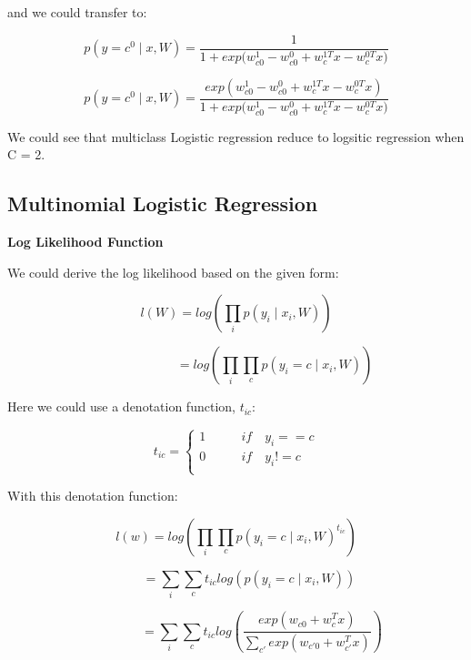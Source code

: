 \documentclass{article} %
\begin{document}
and we could transfer to:

\begin{equation}
p(y=c^0 \mid x, W) = \frac{1}
{1 + {exp(w_{c0}^1 - w_{c0}^0+ w_{c}^{1T} x - w_{c}^{0T} x})}
\end{equation}

\begin{equation}
p(y=c^0 \mid x, W) =
\frac{exp(w_{c0}^1 - w_{c0}^0+ w_{c}^{1T} x - w_{c}^{0T} x)}
{1 + {exp(w_{c0}^1 - w_{c0}^0+ w_{c}^{1T} x - w_{c}^{0T} x})}
\end{equation}

We could see that multiclass Logistic regression reduce to logsitic
regression when C = 2.

\subsection{Multinomial Logistic Regression}
\textbf{Log Likelihood Function}

We could derive the log likelihood based on the given form:

\begin{equation}
l(W) = log (\prod_i p(y_i \mid x_i, W))
\end{equation}

\begin{equation}
\qquad \qquad \qquad = log (\prod_i \prod_c p(y_i = c \mid x_i, W))
\end{equation}

Here we could use a denotation function, $t_{ic}$:

\[ t_{ic} =
    \begin{cases}
        1 & \qquad if \quad y_i == c \\
        0 & \qquad if \quad y_i != c \\
    \end{cases}
\]

With this denotation function:

\begin{equation}
l(w) = log (\prod_i \prod_c p(y_i=c \mid x_i, W)^{t_{ic}})
\end{equation}

\begin{equation}
\qquad = \sum_i \sum_c t_{ic} log(p(y_i=c \mid x_i, W))
\end{equation}

\begin{equation}
\qquad \qquad = \sum_i \sum_c t_{ic} log ( \frac{exp(w_{c0}+w_c^T x)}{\sum_{c'}
exp(w_{c'0}+w_{c'}^T x )} )
\end{equation}
\end{document}
